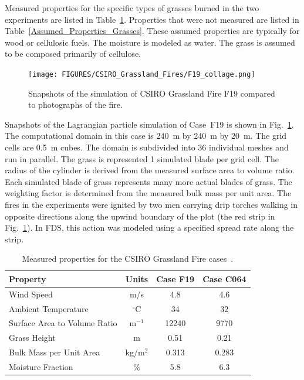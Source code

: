 Measured properties for the specific types of grasses burned in the two experiments are listed in Table~\ref{Properties_Grasses}. Properties that were not measured are listed in Table~\ref{Assumed_Properties_Grasses}. These assumed properties are typically for wood or cellulosic fuels. The moisture is modeled as water. The grass is assumed to be composed primarily of cellulose.



\begin{figure}[p]
\texttt{[image: FIGURES/CSIRO\_Grassland\_Fires/F19\_collage.png]}
\caption[Snapshots of the simulation of CSIRO Grassland Fire F19]{Snapshots of the simulation of CSIRO Grassland Fire F19 compared to photographs of the fire.}
\label{F19}
\end{figure}

Snapshots of the Lagrangian particle simulation of Case~F19 is shown in Fig.~\ref{F19}. The computational domain in this case is 240~m by 240~m by 20~m. The grid cells are 0.5~m cubes. The domain is subdivided into 36 individual meshes and run in parallel. The grass is represented 1 simulated blade per grid cell. The radius of the cylinder is derived from the measured surface area to volume ratio. Each simulated blade of grass represents many more actual blades of grass. The weighting factor is determined from the measured bulk mass per unit area. The fires in the experiments were ignited by two men carrying drip torches walking in opposite directions along the upwind boundary of the plot (the red strip in Fig.~\ref{F19}). In FDS, this action was modeled using a specified spread rate along the strip.

\begin{table}[ht]
\begin{center}
\caption[Measured properties for the CSIRO Grassland Fire cases]{Measured properties for the CSIRO Grassland Fire cases~\cite{Cheney:IJWF1993}.}
\label{Properties_Grasses}
\begin{tabular}{|l|c|c|c|}
\hline
Property                        & Units         & Case F19      & Case C064     \\ \hline \hline
Wind Speed                      & m/s           & 4.8           & 4.6           \\ \hline
Ambient Temperature             & $^\circ$C     & 34            & 32            \\ \hline
Surface Area to Volume Ratio    & m$^{-1}$      & 12240         & 9770          \\ \hline
Grass Height                    & m             & 0.51          & 0.21          \\ \hline
Bulk Mass per Unit Area         & kg/m$^2$      & 0.313         & 0.283         \\ \hline
Moisture Fraction               & \%            & 5.8           & 6.3           \\ \hline
\end{tabular}
\end{center}
\end{table}

